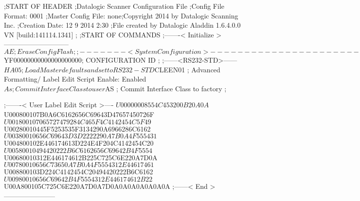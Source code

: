 ;START OF HEADER
;Datalogic Scanner Configuration File
;Config File Format: 0001
;Master Config File: none;Copyright 2014 by Datalogic Scanning Inc.
;Creation Date: 12 9 2014 2:30
;File created by Datalogic Aladdin 1.6.4.0.0 VN [build:141114.1341]
;
;START OF COMMANDS
;-------< Initialize >-----------------------------
$AE                 ; Erase Config Flash
;
;-------< System Configuration >-------------------------------
$YF00000000000000000000; CONFIGURATION ID
;
;------<RS232-STD>------
$HA05              ; Load Master defaults and set to RS232-STD
$CLEEN01            ; Advanced Formatting/ Label Edit Script Enable: Enabled
$As                 ; Commit Interface Class to user
$AS                 ; Commit Interface Class to factory
;

;-------< User Label Edit Script >----
$U00000008554C453200B20A0A
$U000800107B0A6C6162656C69643D47657450726F
$U001800107065727479284C465F4C4142454C5F49
$U00280010445F5253535F3134290A6966286C6162
$U00380010656C69643D3D2222290A7B0A4F555431
$U004800102E446174613D224E4F204C4142454C20
$U00580010494420222B6C6162656C69642B4F5554
$U00680010312E446174612B225C725C6E220A7D0A
$U00780010656C73650A7B0A4F5554312E44617461
$U008800103D224C4142454C20494420222B6C6162
$U00980010656C69642B4F5554312E446174612B22
$U00A800105C725C6E220A7D0A7D0A0A0A0A0A0A0A
;------< End >-----------------------
